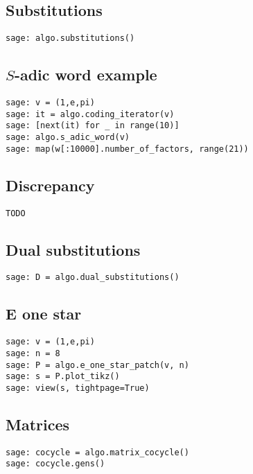 \subsection{Substitutions}
\begin{verbatim}
sage: algo.substitutions()
\end{verbatim}
\subsection{$S$-adic word example}
\begin{verbatim}
sage: v = (1,e,pi)
sage: it = algo.coding_iterator(v)
sage: [next(it) for _ in range(10)]
sage: algo.s_adic_word(v)
sage: map(w[:10000].number_of_factors, range(21))  
\end{verbatim}
\subsection{Discrepancy}
\begin{verbatim}
TODO
\end{verbatim}
\subsection{Dual substitutions}
\begin{verbatim}
sage: D = algo.dual_substitutions()
\end{verbatim}
\subsection{E one star}
\begin{verbatim}
sage: v = (1,e,pi)
sage: n = 8
sage: P = algo.e_one_star_patch(v, n)
sage: s = P.plot_tikz()
sage: view(s, tightpage=True)
\end{verbatim}
\subsection{Matrices}
\begin{verbatim}
sage: cocycle = algo.matrix_cocycle()
sage: cocycle.gens()
\end{verbatim}
\newpage
